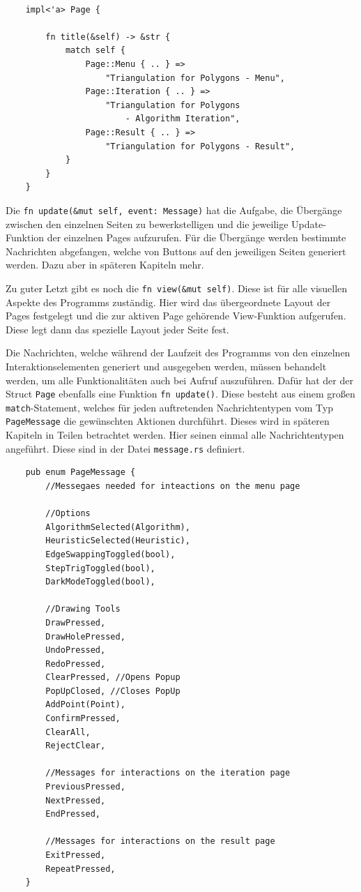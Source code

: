 \begin{lstlisting}
  
    impl<'a> Page {
        
        fn title(&self) -> &str {
            match self {
                Page::Menu { .. } => 
                    "Triangulation for Polygons - Menu",
                Page::Iteration { .. } => 
                    "Triangulation for Polygons 
                        - Algorithm Iteration",
                Page::Result { .. } => 
                    "Triangulation for Polygons - Result",
            }
        }
    }

\end{lstlisting}

Die \lstinline{fn update(&mut self, event: Message)} hat die Aufgabe, die Übergänge zwischen den einzelnen Seiten zu bewerkstelligen und die jeweilige Update-Funktion 
der einzelnen Pages aufzurufen. Für die Übergänge werden bestimmte Nachrichten abgefangen, welche von Buttons auf den jeweiligen Seiten generiert werden. Dazu aber in späteren Kapiteln mehr.

Zu guter Letzt gibt es noch die \lstinline{fn view(&mut self)}. Diese ist für alle visuellen Aspekte des Programms zuständig. Hier wird das übergeordnete Layout der Pages festgelegt und die 
zur aktiven Page gehörende View-Funktion aufgerufen. Diese legt dann das spezielle Layout jeder Seite fest.

Die Nachrichten, welche während der Laufzeit des Programms von den einzelnen Interaktionselementen generiert und ausgegeben werden, müssen behandelt werden, um alle Funktionalitäten auch bei Aufruf auszuführen.
Dafür hat der der Struct \lstinline{Page} ebenfalls eine Funktion \lstinline{fn update()}. Diese besteht aus einem großen \lstinline{match}-Statement, welches für jeden auftretenden Nachrichtentypen vom Typ \lstinline{PageMessage} die gewünschten 
Aktionen durchführt. Dieses wird in späteren Kapiteln in Teilen betrachtet werden. Hier seinen einmal alle Nachrichtentypen angeführt. Diese sind in der Datei \lstinline{message.rs} definiert.

\begin{lstlisting}
    pub enum PageMessage {
        //Messegaes needed for inteactions on the menu page
        
        //Options
        AlgorithmSelected(Algorithm),
        HeuristicSelected(Heuristic),
        EdgeSwappingToggled(bool),
        StepTrigToggled(bool),
        DarkModeToggled(bool),
    
        //Drawing Tools
        DrawPressed,
        DrawHolePressed,
        UndoPressed,
        RedoPressed,
        ClearPressed, //Opens Popup
        PopUpClosed, //Closes PopUp
        AddPoint(Point),
        ConfirmPressed,
        ClearAll,
        RejectClear,
        
        //Messages for interactions on the iteration page
        PreviousPressed,
        NextPressed,
        EndPressed,
    
        //Messages for interactions on the result page
        ExitPressed,
        RepeatPressed,
    }
\end{lstlisting}

